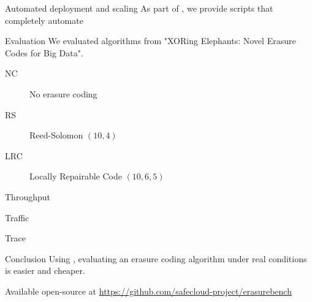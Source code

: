 \begin{frame}{Automated deployment and scaling}
    As part of \sys, we provide scripts that completely automate 
\end{frame}

\subtitle[Evaluation]{Evaluation}

\begin{frame}{Evaluation}
    We evaluated algorithms from "XORing Elephants: Novel Erasure Codes for Big Data".
    \begin{description}
        \item[NC] No erasure coding
        \item[RS] Reed-Solomon $(10,4)$
        \item[LRC] Locally Repairable Code $(10,6,5)$
    \end{description}
\end{frame}

\begin{frame}{Throughput}
    \begin{figure}
        
    \end{figure}
\end{frame}

\begin{frame}{Traffic}
    \begin{figure}
        
    \end{figure}
\end{frame}

\begin{frame}{Trace}
    \begin{figure}
        
    \end{figure}
\end{frame}

\subtitle[Conclusion]{Conclusion}

\begin{frame}{Conclusion}
    Using \sys, evaluating an erasure coding algorithm under real conditions is easier and cheaper.
    \vspace*{5mm}
    
    Available open-source at \url{https://github.com/safecloud-project/erasurebench}
\end{frame}




